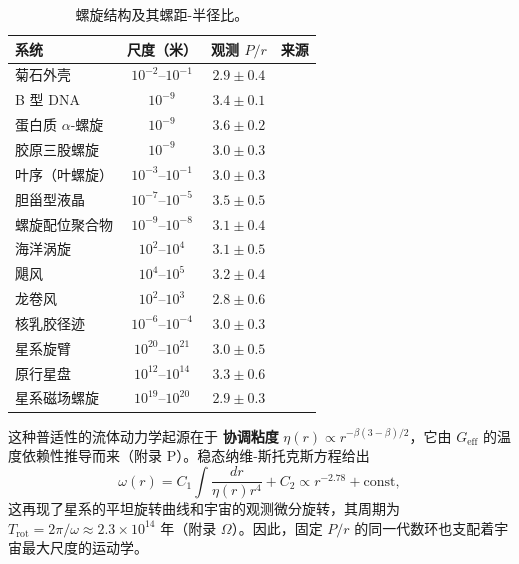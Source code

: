 \documentclass[12pt]{article}
\begin{document}
	\begin{table}[H]
		\centering
		\caption{螺旋结构及其螺距-半径比。}
		\label{tab:spiral-examples}
		\small
		\begin{tabular}{@{}l c c c@{}}
			\toprule
			\textbf{系统} & \textbf{尺度（米）} & \textbf{观测 \(P/r\)} & \textbf{来源} \\
			\midrule
			菊石外壳 & \(10^{-2}\)--\(10^{-1}\) & \(2.9 \pm 0.4\) & \cite{ammonites} \\
			B 型 DNA & \(10^{-9}\) & \(3.4 \pm 0.1\) & \cite{watsoncrick} \\
			蛋白质 \(\alpha\)-螺旋 & \(10^{-9}\) & \(3.6 \pm 0.2\) & \cite{pauling} \\
			胶原三股螺旋 & \(10^{-9}\) & \(3.0 \pm 0.3\) & \cite{collagen} \\
			叶序（叶螺旋） & \(10^{-3}\)--\(10^{-1}\) & \(3.0 \pm 0.3\) & \cite{phyllotaxis} \\
			胆甾型液晶 & \(10^{-7}\)--\(10^{-5}\) & \(3.5 \pm 0.5\) & \cite{cholesteric} \\
			螺旋配位聚合物 & \(10^{-9}\)--\(10^{-8}\) & \(3.1 \pm 0.4\) & \cite{helical-mof} \\
			海洋涡旋 & \(10^{2}\)--\(10^{4}\) & \(3.1 \pm 0.5\) & \cite{ocean-eddies} \\
			飓风 & \(10^{4}\)--\(10^{5}\) & \(3.2 \pm 0.4\) & \cite{hurricanes} \\
			龙卷风 & \(10^{2}\)--\(10^{3}\) & \(2.8 \pm 0.6\) & \cite{tornadoes} \\
			核乳胶径迹 & \(10^{-6}\)--\(10^{-4}\) & \(3.0 \pm 0.3\) & \cite{nuclear-tracks} \\
			星系旋臂 & \(10^{20}\)--\(10^{21}\) & \(3.0 \pm 0.5\) & \cite{binney-tremaine} \\
			原行星盘 & \(10^{12}\)--\(10^{14}\) & \(3.3 \pm 0.6\) & \cite{ppdisk} \\
			星系磁场螺旋 & \(10^{19}\)--\(10^{20}\) & \(2.9 \pm 0.3\) & \cite{beck} \\
			\bottomrule
		\end{tabular}
	\end{table}
	
	这种普适性的流体动力学起源在于 \textbf{协调粘度} \(\eta(r) \propto r^{-\beta(3-\beta)/2}\)，它由 \(G_{\mathrm{eff}}\) 的温度依赖性推导而来（附录 P）。稳态纳维-斯托克斯方程给出
	\[
	\omega(r) = C_1 \int \frac{dr}{\eta(r) r^4} + C_2 \propto r^{-2.78} + \text{const},
	\]
	这再现了星系的平坦旋转曲线和宇宙的观测微分旋转，其周期为 \(T_{\mathrm{rot}} = 2\pi/\omega \approx 2.3\times10^{14}\) 年（附录 \(\Omega\)）。因此，固定 \(P/r\) 的同一代数环也支配着宇宙最大尺度的运动学。
	
\end{document}
